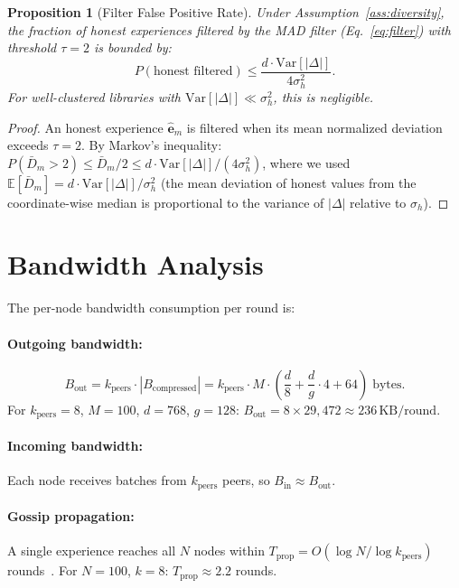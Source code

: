 \documentclass[11pt]{article}
\newtheorem{proposition}[theorem]{Proposition}
\begin{document}
\begin{proposition}[Filter False Positive Rate]
\label{prop:fpr}
Under Assumption~\ref{ass:diversity}, the fraction of honest experiences
filtered by the MAD filter (Eq.~\ref{eq:filter}) with threshold $\tau = 2$
is bounded by:
\begin{equation}
    P(\text{honest filtered}) \leq \frac{d \cdot \mathrm{Var}[|\Delta|]}{4 \sigma_h^2}.
\end{equation}
For well-clustered libraries with $\mathrm{Var}[|\Delta|] \ll \sigma_h^2$,
this is negligible.
\end{proposition}

\begin{proof}
An honest experience $\hat{\bm{e}}_m$ is filtered when its mean normalized
deviation exceeds $\tau = 2$. By Markov's inequality:
$P(\bar{D}_m > 2) \leq \bar{D}_m / 2 \leq d \cdot \mathrm{Var}[|\Delta|] / (4 \sigma_h^2)$,
where we used $\mathbb{E}[\bar{D}_m] = d \cdot \mathrm{Var}[|\Delta|] / \sigma_h^2$
(the mean deviation of honest values from the coordinate-wise median is
proportional to the variance of $|\Delta|$ relative to $\sigma_h$).
\end{proof}

\section{Bandwidth Analysis}
\label{app:bandwidth}

The per-node bandwidth consumption per round is:

\paragraph{Outgoing bandwidth:}
\begin{equation}
    B_{\text{out}} = k_{\text{peers}} \cdot |B_{\text{compressed}}|
    = k_{\text{peers}} \cdot M \cdot \left(\frac{d}{8} + \frac{d}{g} \cdot 4 + 64\right) \; \text{bytes}.
\end{equation}
For $k_{\text{peers}} = 8$, $M = 100$, $d = 768$, $g = 128$:
$B_{\text{out}} = 8 \times 29{,}472 \approx 236\,\text{KB/round}$.

\paragraph{Incoming bandwidth:}
Each node receives batches from $k_{\text{peers}}$ peers, so
$B_{\text{in}} \approx B_{\text{out}}$.

\paragraph{Gossip propagation:}
A single experience reaches all $N$ nodes within
$T_{\text{prop}} = O(\log N / \log k_{\text{peers}})$ rounds~\cite{demers1987epidemic}.
For $N = 100$, $k = 8$: $T_{\text{prop}} \approx 2.2$ rounds.
\end{document}
